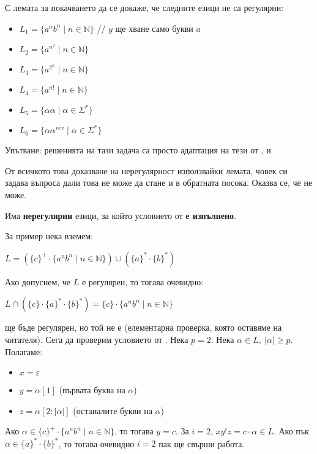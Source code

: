 \begin{problem}
С лемата за покачването да се докаже, че следните езици не са регулярни:
\begin{itemize}
    \item $L_1 = \{ a^nb^n \mid n \in \mathbb{N} \}$ // $y$ ще хване само букви $a$
    \item $L_2 = \{ a^{n^2} \mid n \in \mathbb{N} \}$
    \item $L_3 = \{ a^{2^n} \mid n \in \mathbb{N} \}$
    \item $L_4 = \{ a^{n!} \mid n \in \mathbb{N} \}$
    \item $L_5 = \{ \alpha \alpha \mid \alpha \in \Sigma^* \}$
    \item $L_6 = \{ \alpha \alpha^{rev} \mid \alpha \in \Sigma^* \}$
\end{itemize}
Упътване: решенията на тази задача са просто адаптация на тези от ,  и 
\end{problem}

От всичкото това доказване на нерегулярност използвайки лемата, човек си задава въпроса дали това не може да стане и в обратната посока.
Оказва се, че не може.

\begin{warning}
    Има \textbf{нерегулярни} езици, за който условието от  \textbf{е изпълнено}.
\end{warning}
За пример нека вземем:
\begin{center}
    $L = (\{ c \}^+ \cdot \{ a^nb^n \mid n \in \mathbb{N} \}) \cup (\{ a \}^* \cdot \{ b \}^*)$
\end{center}
Ако допуснем, че $L$ е регулярен, то тогава очевидно:
\begin{center}
    $L \cap (\{ c \} \cdot \{ a \}^* \cdot \{ b \}^*) = \{ c \} \cdot \{ a^nb^n \mid n \in \mathbb{N} \}$
\end{center}
ще бъде регулярен, но той не е (елементарна проверка, която оставяме на читателя).
Сега да проверим условието от .
Нека $p = 2$.
Нека $\alpha \in L, \: |\alpha| \geq p$.
Полагаме:
\begin{itemize}
    \item $x = \varepsilon$
    \item $y = \alpha[1]$ (първата буква на $\alpha$)
    \item $z = \alpha[2:|\alpha|]$ (останалите букви на $\alpha$)
\end{itemize}
Ако $\alpha \in \{ c \}^+ \cdot \{ a^nb^n \mid n \in \mathbb{N} \}$, то тогава $y = c$.
За $i = 2$, $xy^iz = c \cdot \alpha \in L$.
Ако пък $\alpha \in \{ a \}^* \cdot \{ b \}^*$, то тогава очевидно $i = 2$ пак ще свърши работа.